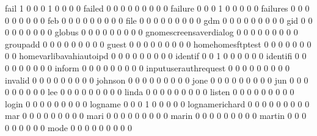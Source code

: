 \documentclass[compress,8pt]{beamer}
\begin{document}
\begin{frame}
\begin{Schunk}
  fail                                       1   0   0   0   1   0   0   0   0
  failed                                     0   0   0   0   0   0   0   0   0
  failure                                    0   0   0   1   0   0   0   0   0
  failures                                   0   0   0   0   0   0   0   0   0
  feb                                        0   0   0   0   0   0   0   0   0
  file                                       0   0   0   0   0   0   0   0   0
  gdm                                        0   0   0   0   0   0   0   0   0
  gid                                        0   0   0   0   0   0   0   0   0
  globus                                     0   0   0   0   0   0   0   0   0
  gnomescreensaverdialog                     0   0   0   0   0   0   0   0   0
  groupadd                                   0   0   0   0   0   0   0   0   0
  guest                                      0   0   0   0   0   0   0   0   0
  homehomesftptest                           0   0   0   0   0   0   0   0   0
  homevarlibavahiautoipd                     0   0   0   0   0   0   0   0   0
  identif                                    0   0   1   0   0   0   0   0   0
  identifi                                   0   0   0   0   0   0   0   0   0
  inform                                     0   0   0   0   0   0   0   0   0
  inputuserauthrequest                       0   0   0   0   0   0   0   0   0
  invalid                                    0   0   0   0   0   0   0   0   0
  johnson                                    0   0   0   0   0   0   0   0   0
  jone                                       0   0   0   0   0   0   0   0   0
  jun                                        0   0   0   0   0   0   0   0   0
  lee                                        0   0   0   0   0   0   0   0   0
  linda                                      0   0   0   0   0   0   0   0   0
  listen                                     0   0   0   0   0   0   0   0   0
  login                                      0   0   0   0   0   0   0   0   0
  logname                                    0   0   0   1   0   0   0   0   0
  lognamerichard                             0   0   0   0   0   0   0   0   0
  mar                                        0   0   0   0   0   0   0   0   0
  mari                                       0   0   0   0   0   0   0   0   0
  marin                                      0   0   0   0   0   0   0   0   0
  martin                                     0   0   0   0   0   0   0   0   0
  mode                                       0   0   0   0   0   0   0   0   0

\end{Schunk}
\end{frame}
\end{document}
